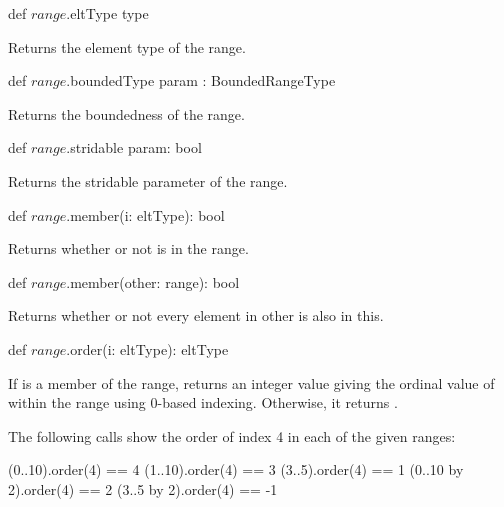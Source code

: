 \begin{protohead}
def $range$.eltType type
\end{protohead}
\begin{protobody}
Returns the element type of the range.
\end{protobody}

\begin{protohead}
def $range$.boundedType param : BoundedRangeType
\end{protohead}
\begin{protobody}
Returns the boundedness of the range.
\end{protobody}

\begin{protohead}
def $range$.stridable param: bool
\end{protohead}
\begin{protobody}
Returns the stridable parameter of the range.
\end{protobody}

\begin{protohead}
def $range$.member(i: eltType): bool
\end{protohead}
\begin{protobody}
Returns whether or not  is in the range.
\end{protobody}

\begin{protohead}
def $range$.member(other: range): bool
\end{protohead}
\begin{protobody}
Returns whether or not every element in other is also in this.
\end{protobody}

\begin{protohead}
def $range$.order(i: eltType): eltType
\end{protohead}
\begin{protobody}
If  is a member of the range, returns an integer value giving
the ordinal value of  within the range using 0-based indexing.
Otherwise, it returns .
\end{protobody}

\begin{example}
The following calls show the order of index 4 in each of the given
ranges:
\begin{chapel}
(0..10).order(4) == 4
(1..10).order(4) == 3
(3..5).order(4) == 1
(0..10 by 2).order(4) == 2
(3..5 by 2).order(4) == -1
\end{chapel}
\end{example}
